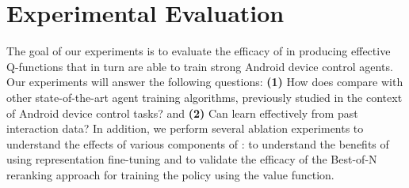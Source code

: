 
\vspace{-0.2cm}
\section{Experimental Evaluation} \label{sec:experiments}
\vspace{-0.1cm}
The goal of our experiments is to evaluate the efficacy of \ourmethod{} in producing effective Q-functions that in turn are able to train strong Android device control agents. Our experiments will answer the following questions: 
\textbf{(1)} How does \ourmethod{} compare with other state-of-the-art agent training algorithms, previously studied in the context of Android device control tasks? and \textbf{(2)} Can \ourmethod{} learn effectively from past interaction data? 
In addition, we perform several ablation experiments to understand the effects of various components of \ourmethod{}: to understand the benefits of using representation fine-tuning and to validate the efficacy of the Best-of-N reranking approach for training the policy using the value function.


\vspace{-0.3cm}
